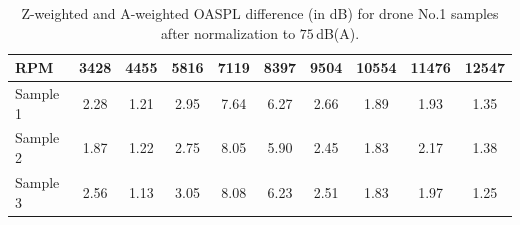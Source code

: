 \begin{table}[!ht]
\caption{Z-weighted and A-weighted OASPL difference (in dB) for drone No.1 samples after normalization to $75\,$dB(A).}
\vskip3pt
\setlength{\tabcolsep}{6pt}
\begin{tabular}{l|ccccccccc}
\hline\hline
RPM & 3428 & 4455 & 5816 & 7119 & 8397 & 9504 & 10554 & 11476 & 12547 \\
\hline
Sample 1 & 2.28 & 1.21 & 2.95 & 7.64 & 6.27 & 2.66 & 1.89 & 1.93 & 1.35 \\
Sample 2 & 1.87 & 1.22 & 2.75 & 8.05 & 5.90 & 2.45 & 1.83 & 2.17 & 1.38 \\
Sample 3 & 2.56 & 1.13 & 3.05 & 8.08 & 6.23 & 2.51 & 1.83 & 1.97 & 1.25 \\
\hline\hline
\end{tabular}
\label{drone1az}
\end{table}

